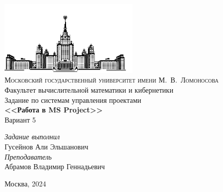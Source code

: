 \documentclass[14pt]{article}
\begin{document}
\thispagestyle{empty}
\begin{center}
	\ \vspace{-4cm}\\
	\includegraphics[width=0.5\textwidth]{../img/msu.png}\\
	{\scshape Московский государственный университет имени М.~В.~Ломоносова}\\
	Факультет вычислительной  математики и кибернетики\\
	\vfill
	{\LARGE Задание по системам управления проектами}\\
	\vspace{1cm}
	{\Huge\bfseries <<Работа в MS Project>>}\\
	{\Huge Вариант 5} 
\end{center}
\vspace{1cm}
\begin{flushright}
	\large
	\textit{Задание выполнил}\\
	Гусейнов Али Эльшанович\\
	\vspace{5mm}
	\textit{Преподаватель}\\
	Абрамов Владимир Геннадьевич
\end{flushright}
\vfill
\begin{center}
	Москва, 2024
\end{center}
\end{document}
